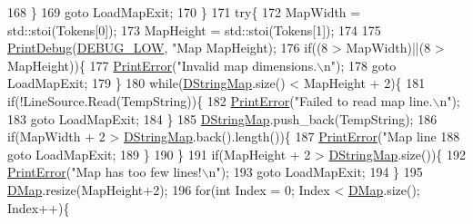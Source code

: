 \begin{DoxyCode}
{{168         \}
169         \textcolor{keywordflow}{goto} LoadMapExit;
170     \}
171     \textcolor{keywordflow}{try}\{
172         MapWidth = std::stoi(Tokens[0]);
173         MapHeight = std::stoi(Tokens[1]);
174             
175         \hyperlink{Debug_8h_aa5f00f5537c9760f6ae1782460748ab9}{PrintDebug}(\hyperlink{Debug_8h_a3a5f3fc09784650d8388cb854882f840}{DEBUG\_LOW}, \textcolor{stringliteral}{"Map %
      MapHeight); 
176         \textcolor{keywordflow}{if}((8 > MapWidth)||(8 > MapHeight))\{
177             \hyperlink{Debug_8h_a2ed825eefefe35baf59a93a8c641323d}{PrintError}(\textcolor{stringliteral}{"Invalid map dimensions.\(\backslash\)n"});
178             \textcolor{keywordflow}{goto} LoadMapExit;        
179         \}
180         \textcolor{keywordflow}{while}(\hyperlink{classCTerrainMap_a76db5fd05e22e0aea413f49175f9c282}{DStringMap}.size() < MapHeight + 2)\{
181             \textcolor{keywordflow}{if}(!LineSource.Read(TempString))\{
182                 \hyperlink{Debug_8h_a2ed825eefefe35baf59a93a8c641323d}{PrintError}(\textcolor{stringliteral}{"Failed to read map line.\(\backslash\)n"});
183                 \textcolor{keywordflow}{goto} LoadMapExit;
184             \}                                 
185             \hyperlink{classCTerrainMap_a76db5fd05e22e0aea413f49175f9c282}{DStringMap}.push\_back(TempString);
186             \textcolor{keywordflow}{if}(MapWidth + 2 > \hyperlink{classCTerrainMap_a76db5fd05e22e0aea413f49175f9c282}{DStringMap}.back().length())\{
187                 \hyperlink{Debug_8h_a2ed825eefefe35baf59a93a8c641323d}{PrintError}(\textcolor{stringliteral}{"Map line %
188                 \textcolor{keywordflow}{goto} LoadMapExit;
189             \}
190         \}
191         \textcolor{keywordflow}{if}(MapHeight + 2 > \hyperlink{classCTerrainMap_a76db5fd05e22e0aea413f49175f9c282}{DStringMap}.size())\{
192             \hyperlink{Debug_8h_a2ed825eefefe35baf59a93a8c641323d}{PrintError}(\textcolor{stringliteral}{"Map has too few lines!\(\backslash\)n"});
193             \textcolor{keywordflow}{goto} LoadMapExit;
194         \}
195         \hyperlink{classCTerrainMap_a80d154ce478948b10473534a7bca13f6}{DMap}.resize(MapHeight+2);
196         \textcolor{keywordflow}{for}(\textcolor{keywordtype}{int} Index = 0; Index < \hyperlink{classCTerrainMap_a80d154ce478948b10473534a7bca13f6}{DMap}.size(); Index++)\{
}}}}
\end{DoxyCode}
